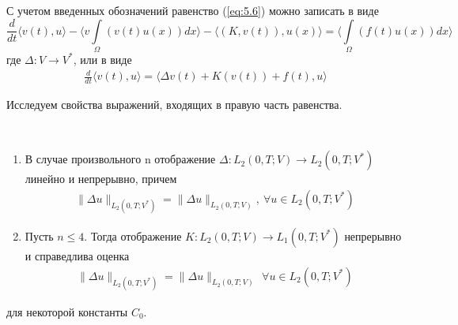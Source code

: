 С учетом введенных обозначений равенство (\ref{eq:5.6}) можно записать в виде
$$\frac{d}{dt} \langle v(t),u \rangle - \langle v\int\limits_\Omega(v(t)u(x))dx \rangle - \langle (K,v(t)),u(x) \rangle = \langle \int\limits_\Omega(f(t)u(x))dx \rangle $$
где $\Delta: V \rightarrow V^\ast$, или в виде
\begin{equation}\label{eq:5.8}
    \begin{gathered}
        \frac{d}{dt} \langle v(t),u \rangle = \langle \Delta v(t)+K(v(t))+f(t), u \rangle
    \end{gathered}
\end{equation}

Исследуем свойства выражений, входящих в правую часть равенства.
\begin{lemma} ~\\
    \begin{enumerate} 
        \item В случае произвольного n отображение \linebreak $\Delta: L_2(0, T; V) \rightarrow L_2(0, T; V^\ast)$ линейно и непрерывно, причем
        \begin{equation}\label{eq:5.9}
            \begin{gathered}
                \parallel \Delta u \parallel_{L_2(0, T; V^\ast)} = \parallel \Delta u \parallel_{L_2(0, T; V)}, \ \forall u \in L_2(0, T; V^\ast)
            \end{gathered}
        \end{equation}
        \item Пусть $n \le 4$. Тогда отображение $K: L_2(0, T; V) \rightarrow L_1(0, T; V^\ast)$ непрерывно и справедлива оценка
        \begin{equation}\label{eq:5.10}
            \begin{gathered}
                \parallel \Delta u \parallel_{L_2(0, T; V^\ast)} = \parallel \Delta u \parallel_{L_2(0, T; V)}\, \ \forall u \in L_2(0, T; V^\ast)
            \end{gathered}
        \end{equation}
    \end{enumerate}
    для некоторой константы $C_0$.
\end{lemma}

